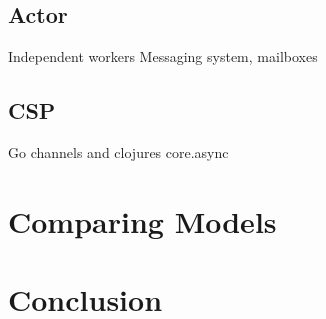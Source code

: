 \documentclass{sig-alternate}
\begin{document}
\subsection{Actor}
Independent workers
Messaging system, mailboxes

\subsection{CSP}
Go channels and clojures core.async

\subsection{}

\section{Comparing Models}

\section{Conclusion}






\end{document}
